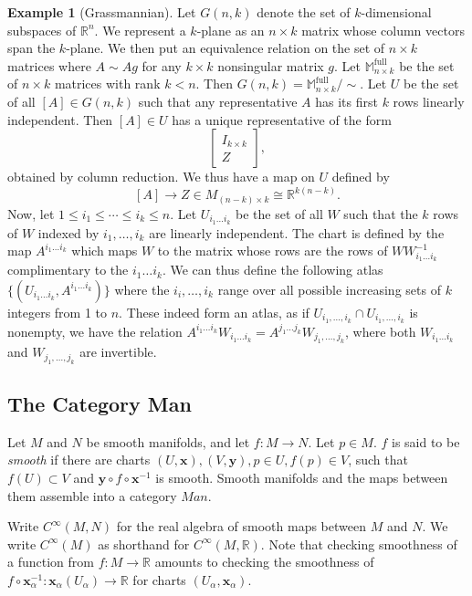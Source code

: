 \documentclass{article}
\theoremstyle{definition}
\newtheorem{ex}{Example}[section]
\newcommand{\R}{\mathbb{R}}
\let\vec\mathbf
\begin{document}
\begin{ex}[Grassmannian]
Let $G(n,k)$ denote the set of $k$-dimensional subspaces of $\R^{n}.$ We represent a $k$-plane as an $n\times k$ matrix whose column vectors span the $k$-plane. We then put an equivalence relation on the set of $n\times k$ matrices where $A\sim Ag$ for any $k\times k$ nonsingular matrix $g$. Let $\mathbb{M}_{n\times k}^{\text{full}}$ be the set of $n\times k$ matrices with rank $k<n$. Then $G(n,k)=\mathbb{M}_{n\times k}^{\text{full}}/\sim.$ Let $U$ be the set of all $[A]\in G(n,k)$ such that any representative $A$ has its first $k$ rows linearly independent. Then $[A]\in U$ has a unique representative of the form
\[
\begin{bmatrix}
I_{k\times k}\\
Z
\end{bmatrix},
\]
obtained by column reduction. We thus have a map on $U$ defined by
\[[A]\rightarrow Z\in M_{(n-k)\times k}\cong\R^{k(n-k)}. \] Now, let $1\leq i_{1}\leq\cdots\leq i_{k}\leq n$. Let $U_{i_{1}\dots i_{k}}$ be the set of all $W$ such that the $k$ rows of $W$ indexed by $i_{1},\dots,i_{k}$ are linearly independent. The chart is defined by the map $A^{i_{1}\dots i_{k}}$ which maps $W$ to the matrix whose rows are the rows of $WW^{-1}_{i_{1}\dots{i_k}}$ complimentary to the $i_{1}\dots i_{k}.$  We can thus define the following atlas $\{(U_{i_{1}\dots i_{k}},A^{i_{1}\dots i_{k}})\}$ where the $i_{i},\dots,i_{k}$ range over all possible increasing sets of $k$ integers from 1 to $n$. These indeed form an atlas, as if $U_{i_{1},\dots,i_{k}}\cap U_{i_{1},\dots,i_{k}}$ is nonempty, we have the relation $A^{i_{1}\dots i_{k}}W_{i_{1}\dots i_{k}}=A^{j_{1}\dots j_{k}}W_{j_{1},\dots,j_{k}}$, where both $W_{i_{1}\dots i_{k}}$ and $W_{j_{1},\dots,j_{k}}$ are invertible. 
\end{ex}
\subsection{The Category Man}
Let $M$ and $N$ be smooth manifolds, and let $f:M\rightarrow N$. Let $p\in M$. $f$ is said to be \textit{smooth} if there are charts $(U,\vec{x}),(V,\vec{y}),p\in U,f(p)\in V$, such that $f(U)\subset V$ and $\vec{y}\circ f\circ\vec{x}^{-1}$ is smooth. Smooth manifolds and the maps between them assemble into a category $Man$.

Write $C^{\infty}(M,N)$ for the real algebra of smooth maps between $M$ and $N$. We write $C^{\infty}(M)$ as shorthand for $C^{\infty}(M,\R).$ Note that checking smoothness of a function from $f:M\rightarrow\R$ amounts to checking the smoothness of $f\circ\vec{x}_{\alpha}^{-1}:\vec{x}_{\alpha}(U_{\alpha})\rightarrow\R$ for charts $(U_{\alpha},\vec{x}_{\alpha})$.
\end{document}
